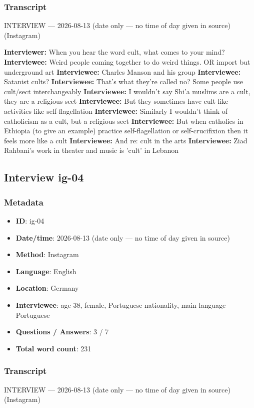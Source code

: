 \subsubsection*{Transcript}
INTERVIEW — 2026-08-13 (date only — no time of day given in source) (Instagram)

\textbf{Interviewer:} When you hear the word cult, what comes to your mind?
\textbf{Interviewee:} Weird people coming together to do weird things. OR import but underground art
\textbf{Interviewee:} Charles Manson and his group
\textbf{Interviewee:} Satanist cults?
\textbf{Interviewee:} That's what they're called no? Some people use cult/sect interchangeably
\textbf{Interviewee:} I wouldn't say Shi'a muslims are a cult, they are a religious sect
\textbf{Interviewee:} But they sometimes have cult-like activities like self-flagellation
\textbf{Interviewee:} Similarly I wouldn't think of catholicism as a cult, but a religious sect
\textbf{Interviewee:} But when catholics in Ethiopia (to give an example) practice self-flagellation or self-crucifixion then it feels more like a cult
\textbf{Interviewee:} And re: cult in the arts
\textbf{Interviewee:} Ziad Rahbani's work in theater and music is 'cult' in Lebanon

\subsection{Interview ig-04}\label{int:ig-04}
\subsubsection*{Metadata}
\begin{itemize}
  \item \textbf{ID}: ig-04
  \item \textbf{Date/time}: 2026-08-13 (date only — no time of day given in source)
  \item \textbf{Method}: Instagram
  \item \textbf{Language}: English
  \item \textbf{Location}: Germany
  \item \textbf{Interviewee}: age 38, female, Portuguese nationality, main language Portuguese
  \item \textbf{Questions / Answers}: 3 / 7
  \item \textbf{Total word count}: 231
\end{itemize}
\subsubsection*{Transcript}
INTERVIEW — 2026-08-13 (date only — no time of day given in source) (Instagram)

